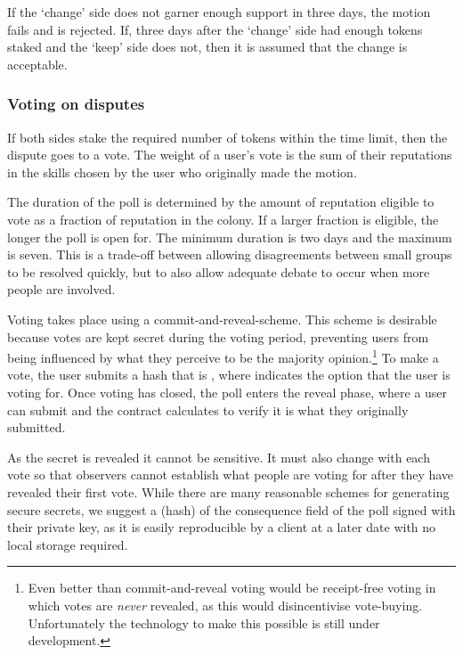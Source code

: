If the `change' side does not garner enough support in three days, the motion fails and is rejected. If, three days after the `change' side had enough tokens staked and the `keep' side does not, then it is assumed that the change is acceptable.

\subsubsection*{Voting on disputes}

If both sides stake the required number of tokens within the time limit, then the dispute goes to a vote. The weight of a user's vote is the sum of their reputations in the skills chosen by the user who originally made the motion.

The duration of the poll is determined by the amount of reputation eligible to vote as a fraction of reputation in the colony. If a larger fraction is eligible, the longer the poll is open for. The minimum duration is two days and the maximum is seven. This is a trade-off between allowing disagreements between small groups to be resolved quickly, but to also allow adequate debate to occur when more people are involved.

Voting takes place using a commit-and-reveal-scheme. This scheme is desirable because votes are kept secret during the voting period, preventing users from being influenced by what they perceive to be the majority opinion.\footnote{Even better than commit-and-reveal voting would be receipt-free voting in which votes are \textit{never} revealed, as this would disincentivise vote-buying. Unfortunately the technology to make this possible is still under development.} To make a vote, the user submits a hash that is , where  indicates the option that the user is voting for. Once voting has closed, the poll enters the reveal phase, where a user can submit  and the contract calculates  to verify it is what they originally submitted.

As the secret is revealed it cannot be sensitive. It must also change with each vote so that observers cannot establish what people are voting for after they have revealed their first vote. While there are many reasonable schemes for generating secure secrets, we suggest a (hash) of the consequence field of the poll signed with their private key, as it is easily reproducible by a client at a later date with no local storage required. \\

